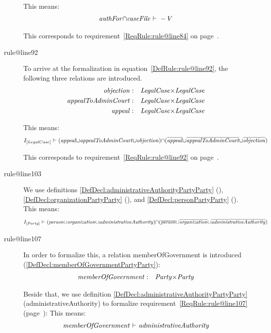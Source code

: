 \documentclass[10pt,a4paper]{report}              %
\theoremstyle{plain}\theorembodyfont{\rmfamily}\newtheorem{definition}{Definition}[section]
\theoremstyle{plain}\theorembodyfont{\rmfamily}\newtheorem{designrule}[definition]{Requirement}
\def\id#1{\mbox{\em #1\/}}
\newcommand{\cmpl}[1]{\overline{#1}}
\begin{document}
\begin{description}
This means: 
\begin{equation}
   {\id{authFor}}{\cap}{\id{caseFile}}\ {\vdash}\ -V\label{DefRule:rule@line84}
\end{equation}

This corresponds to requirement~\ref{ReqRule:rule@line84} on page~\pageref{ReqRule:rule@line84}.
\item[rule@line92]
To arrive at the formalization in equation~\ref{DefRule:rule@line92}, the following three relations are introduced.
\begin{eqnarray}
   {\id{objection}}&:&{\id{LegalCase}}{\times}{\id{LegalCase}}\label{DefDecl:objectionLegalCaseLegalCase}\\
   {\id{appealToAdminCourt}}&:&{\id{LegalCase}}{\times}{\id{LegalCase}}\label{DefDecl:appealToAdminCourtLegalCaseLegalCase}\\
   {\id{appeal}}&:&{\id{LegalCase}}{\times}{\id{LegalCase}}\label{DefDecl:appealLegalCaseLegalCase}
\end{eqnarray}

This means: 
\begin{equation}
   I_{[LegalCase]}\ {\vdash}\ ({\id{appeal}}{\cup}{\id{appealToAdminCourt}}{\cup}{\id{objection}}){\cap}(\cmpl{{\id{appeal}}}{\cup}\cmpl{{\id{appealToAdminCourt}}}{\cup}\cmpl{{\id{objection}}})\label{DefRule:rule@line92}
\end{equation}

This corresponds to requirement~\ref{ReqRule:rule@line92} on page~\pageref{ReqRule:rule@line92}.
\item[rule@line103]
We use definitions \ref{DefDecl:administrativeAuthorityPartyParty} ({}), \ref{DefDecl:organizationPartyParty} ({}), and \ref{DefDecl:personPartyParty} ({}). 
This means: 
\begin{equation}
   I_{[Party]}\ {\vdash}\ ({\id{person}}{\cup}{\id{organization}}{\cup}{\id{administrativeAuthority}}){\cap}(\cmpl{{\id{person}}}{\cup}\cmpl{{\id{organization}}}{\cup}\cmpl{{\id{administrativeAuthority}}})\label{DefRule:rule@line103}
\end{equation}

\item[rule@line107]
In order to formalize this, a relation
memberOfGovernment is introduced (\ref{DefDecl:memberOfGovernmentPartyParty}):
\begin{eqnarray}
   {\id{memberOfGovernment}}&:&{\id{Party}}{\times}{\id{Party}}\label{DefDecl:memberOfGovernmentPartyParty}
\end{eqnarray}

Beside that, we use definition \ref{DefDecl:administrativeAuthorityPartyParty}
(administrativeAuthority) to formalize requirement~\ref{ReqRule:rule@line107} (page~\pageref{ReqRule:rule@line107}):
This means: 
\begin{equation}
   {\id{memberOfGovernment}}\ {\vdash}\ {\id{administrativeAuthority}}\label{DefRule:rule@line107}
\end{equation}

\end{description}
\end{document}
